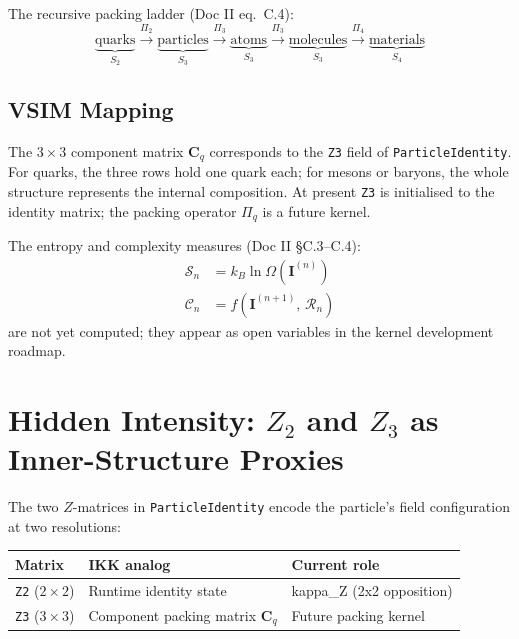 \documentclass[11pt, a4paper, oneside]{article}
\newcommand{\Res}{\mathcal{R}}
\newcommand{\Pack}{\Pi}
\theoremstyle{definition}
\theoremstyle{remark}
\begin{document}
The recursive packing ladder (Doc II eq.\ C.4):
\begin{equation}
  \underbrace{\text{quarks}}_{S_2}
  \xrightarrow{\Pack_2}
  \underbrace{\text{particles}}_{S_3}
  \xrightarrow{\Pack_3}
  \underbrace{\text{atoms}}_{S_3}
  \xrightarrow{\Pack_3}
  \underbrace{\text{molecules}}_{S_3}
  \xrightarrow{\Pack_4}
  \underbrace{\text{materials}}_{S_4}
\end{equation}

\subsection{VSIM Mapping}

The $3\times 3$ component matrix $\mathbf{C}_q$ corresponds to the
\texttt{Z3} field of \texttt{ParticleIdentity}.  For quarks, the three rows
hold one quark each; for mesons or baryons, the whole structure represents
the internal composition.  At present \texttt{Z3} is initialised to the
identity matrix; the packing operator $\Pack_q$ is a future kernel.

The entropy and complexity measures (Doc II \S C.3--C.4):
\begin{align}
  \mathcal{S}_n &= k_B \ln \Omega(\mathbf{I}^{(n)}) \\
  \mathcal{C}_n &= f(\mathbf{I}^{(n+1)},\, \Res_n)
\end{align}
are not yet computed; they appear as open variables in the kernel
development roadmap.

\section{Hidden Intensity: $Z_2$ and $Z_3$ as Inner-Structure Proxies}

The two $Z$-matrices in \texttt{ParticleIdentity} encode the particle's
field configuration at two resolutions:

\begin{center}
  \begin{tabular}{l l l}
	\toprule
	Matrix & IKK analog & Current role \\
	\midrule
	\texttt{Z2} ($2\times 2$) & Runtime identity state & kappa\_Z (2x2 opposition) \\
	\texttt{Z3} ($3\times 3$) & Component packing matrix $\mathbf{C}_q$ & Future packing kernel \\
	\bottomrule
  \end{tabular}
\end{center}
\end{document}

